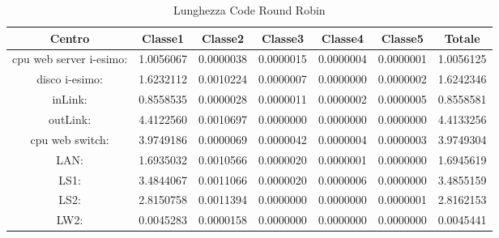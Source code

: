\begin{table}[H]
\begin{center}\begin{scriptsize}
\begin{tabular}{||c|c|c|c|c|c|c||}
\hline
Centro &Classe1 &Classe2 &Classe3 &Classe4 &Classe5 &Totale\\
\hline
\hline
 cpu web server i-esimo: 	&1.0056067	&0.0000038	&0.0000015	&0.0000004	&0.0000001	&1.0056125\\
\hline
 disco i-esimo: 	&1.6232112	&0.0010224	&0.0000007	&0.0000000	&0.0000002	&1.6242346\\
\hline
 inLink: 	&0.8558535	&0.0000028	&0.0000011	&0.0000002	&0.0000005	&0.8558581\\
\hline
 outLink: 	&4.4122560	&0.0010697	&0.0000000	&0.0000000	&0.0000000	&4.4133256\\
\hline
 cpu web switch: 	&3.9749186	&0.0000069	&0.0000042	&0.0000004	&0.0000003	&3.9749304\\
\hline
 LAN: 	&1.6935032	&0.0010566	&0.0000020	&0.0000001	&0.0000000	&1.6945619\\
\hline
 LS1: 	&3.4844067	&0.0011066	&0.0000020	&0.0000006	&0.0000000	&3.4855159\\
\hline
 LS2: 	&2.8150758	&0.0011394	&0.0000000	&0.0000000	&0.0000001	&2.8162153\\
\hline
 LW2: 	&0.0045283	&0.0000158	&0.0000000	&0.0000000	&0.0000000	&0.0045441\\
\hline
\end{tabular}
\end{scriptsize}\end{center}
\caption{Lunghezza Code Round Robin}
\label{lunghezzacode}
\end{table}

